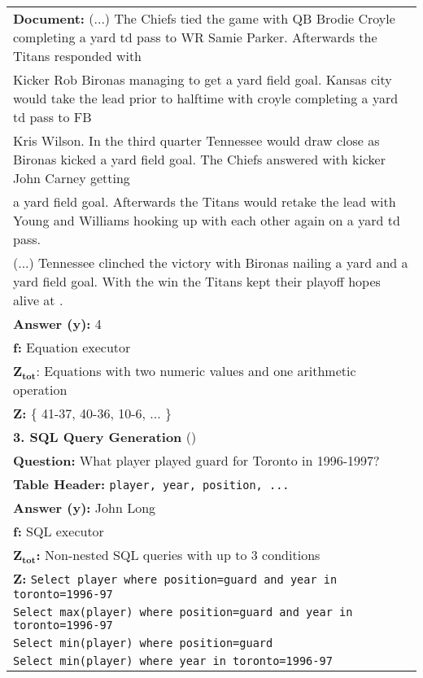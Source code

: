 \documentclass[11pt,a4paper]{article}
\begin{document}
\begin{table*}[tb]
\begin{tabulary}{\textwidth}{l}
        \textbf{Document:} (...) The Chiefs tied the game with QB Brodie Croyle completing a  yard td pass to WR Samie Parker. Afterwards the Titans responded with \\ Kicker Rob Bironas managing to get a  yard field goal. Kansas city would take the lead prior to halftime with croyle completing a  yard td pass to FB \\ Kris Wilson. In the third  quarter Tennessee would draw close as Bironas kicked a  yard field goal. The Chiefs answered with kicker John Carney getting \\ a  yard field goal. Afterwards the Titans would retake the lead with Young and Williams hooking up with each other again on a  yard td pass. \\ (...) Tennessee clinched the victory with Bironas nailing a  yard and a  yard field goal. With the win the Titans kept their playoff hopes alive at . \\
        \textbf{Answer ($\boldsymbol{y}$):} 4 \\
        \textbf{$\boldsymbol{f}$:} Equation executor \\
        \textbf{$\boldsymbol{Z_\text{tot}}$}: Equations with two numeric values and one arithmetic operation \\ \textbf{$\boldsymbol{Z}$:} \{ 41-37, 40-36, 10-6,  ... \} \\
    \midrule
        \textbf{3. SQL Query Generation} (\wikisql{}) \\
    \midrule
        \textbf{Question:} What player played guard for Toronto in 1996-1997? \\ \textbf{Table Header:} \texttt{player, year, position, ...}\\
        \textbf{Answer ($\boldsymbol{y}$):} John Long \\
        \textbf{$\boldsymbol{f}$:} SQL executor \\
        \textbf{$\boldsymbol{Z_\text{tot}}$:} Non-nested SQL queries with up to 3 conditions\\
        \textbf{$\boldsymbol{Z}$:} \texttt{Select {player} where position=guard and year in toronto=1996-97} \\
        \texttt{Select max(player) where position=guard and year in toronto=1996-97} \\ \texttt{Select min(player) where position=guard} \\
        \texttt{Select min(player) where year in toronto=1996-97} \\

\end{tabulary}
\end{table*}
\end{document}
